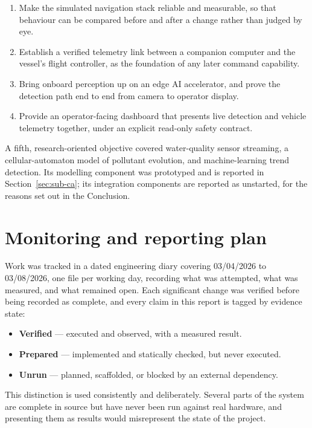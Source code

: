 \documentclass[a4paper,12pt,oneside,openany]{report}
\begin{document}
\begin{enumerate}
  \item Make the simulated navigation stack reliable and measurable, so that behaviour can be
        compared before and after a change rather than judged by eye.
  \item Establish a verified telemetry link between a companion computer and the vessel's flight
        controller, as the foundation of any later command capability.
  \item Bring onboard perception up on an edge AI accelerator, and prove the detection path end to
        end from camera to operator display.
  \item Provide an operator-facing dashboard that presents live detection and vehicle telemetry
        together, under an explicit read-only safety contract.
\end{enumerate}

A fifth, research-oriented objective covered water-quality sensor streaming, a cellular-automaton
model of pollutant evolution, and machine-learning trend detection. Its modelling component was
prototyped and is reported in Section~\ref{sec:sub-ca}; its integration components are reported as
unstarted, for the reasons set out in the Conclusion.

\section*{Monitoring and reporting plan}

Work was tracked in a dated engineering diary covering 03/04/2026 to 03/08/2026, one file per
working day, recording what was attempted, what was measured, and what remained open. Each
significant change was verified before being recorded as complete, and every claim in this report
is tagged by evidence state:

\begin{itemize}
  \item \textbf{Verified} --- executed and observed, with a measured result.
  \item \textbf{Prepared} --- implemented and statically checked, but never executed.
  \item \textbf{Unrun} --- planned, scaffolded, or blocked by an external dependency.
\end{itemize}

This distinction is used consistently and deliberately. Several parts of the system are complete in
source but have never been run against real hardware, and presenting them as results would
misrepresent the state of the project.
\end{document}
